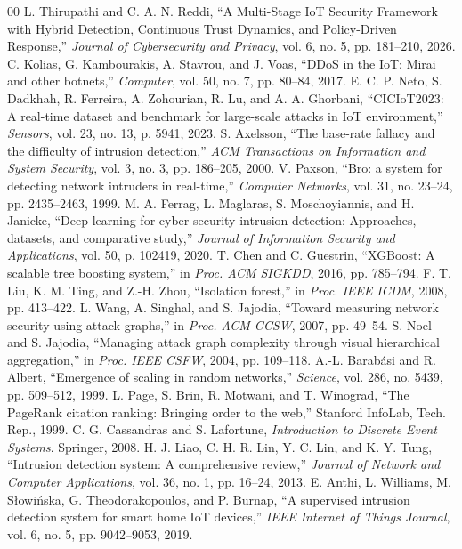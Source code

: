 \documentclass[journal,10pt,onecolumn]{IEEEtran}
\begin{document}
\begin{thebibliography}{00}
 L. Thirupathi and C. A. N. Reddi, ``A Multi-Stage IoT Security Framework with Hybrid Detection, Continuous Trust Dynamics, and Policy-Driven Response,'' \textit{Journal of Cybersecurity and Privacy}, vol. 6, no. 5, pp. 181--210, 2026.
 C. Kolias, G. Kambourakis, A. Stavrou, and J. Voas, ``DDoS in the IoT: Mirai and other botnets,'' \textit{Computer}, vol. 50, no. 7, pp. 80--84, 2017.
 E. C. P. Neto, S. Dadkhah, R. Ferreira, A. Zohourian, R. Lu, and A. A. Ghorbani, ``CICIoT2023: A real-time dataset and benchmark for large-scale attacks in IoT environment,'' \textit{Sensors}, vol. 23, no. 13, p. 5941, 2023.
 S. Axelsson, ``The base-rate fallacy and the difficulty of intrusion detection,'' \textit{ACM Transactions on Information and System Security}, vol. 3, no. 3, pp. 186--205, 2000.
 V. Paxson, ``Bro: a system for detecting network intruders in real-time,'' \textit{Computer Networks}, vol. 31, no. 23--24, pp. 2435--2463, 1999.
 M. A. Ferrag, L. Maglaras, S. Moschoyiannis, and H. Janicke, ``Deep learning for cyber security intrusion detection: Approaches, datasets, and comparative study,'' \textit{Journal of Information Security and Applications}, vol. 50, p. 102419, 2020.
 T. Chen and C. Guestrin, ``XGBoost: A scalable tree boosting system,'' in \textit{Proc. ACM SIGKDD}, 2016, pp. 785--794.
 F. T. Liu, K. M. Ting, and Z.-H. Zhou, ``Isolation forest,'' in \textit{Proc. IEEE ICDM}, 2008, pp. 413--422.
 L. Wang, A. Singhal, and S. Jajodia, ``Toward measuring network security using attack graphs,'' in \textit{Proc. ACM CCSW}, 2007, pp. 49--54.
 S. Noel and S. Jajodia, ``Managing attack graph complexity through visual hierarchical aggregation,'' in \textit{Proc. IEEE CSFW}, 2004, pp. 109--118.
 A.-L. Barab\'asi and R. Albert, ``Emergence of scaling in random networks,'' \textit{Science}, vol. 286, no. 5439, pp. 509--512, 1999.
 L. Page, S. Brin, R. Motwani, and T. Winograd, ``The PageRank citation ranking: Bringing order to the web,'' Stanford InfoLab, Tech. Rep., 1999.
 C. G. Cassandras and S. Lafortune, \textit{Introduction to Discrete Event Systems}. Springer, 2008.
 H. J. Liao, C. H. R. Lin, Y. C. Lin, and K. Y. Tung, ``Intrusion detection system: A comprehensive review,'' \textit{Journal of Network and Computer Applications}, vol. 36, no. 1, pp. 16--24, 2013.
 E. Anthi, L. Williams, M. S{\l}owi{\'n}ska, G. Theodorakopoulos, and P. Burnap, ``A supervised intrusion detection system for smart home IoT devices,'' \textit{IEEE Internet of Things Journal}, vol. 6, no. 5, pp. 9042--9053, 2019.

\end{thebibliography}
\end{document}

